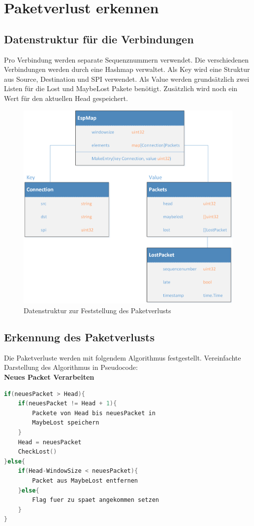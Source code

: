 \section{Paketverlust erkennen}
\label{sec:Paketverlust erkennen}

\subsection{Datenstruktur für die \esp Verbindungen}
Pro Verbindung werden separate Sequenznummern verwendet. Die verschiedenen Verbindungen werden durch eine Hashmap verwaltet. Als Key wird eine Struktur aus Source, Destination und \acs{SPI} verwendet. Als Value werden grundsätzlich zwei Listen für die Lost und MaybeLost Pakete benötigt. Zusätzlich wird noch ein Wert für den aktuellen Head gespeichert.


\begin{figure}[H]
    \begin{center}
        \includegraphics[trim=1 0 0 0,clip,width=\textwidth]{start/img/Datenstruktur.png}
    \end{center}
    \caption{Datenstruktur zur Feststellung des Paketverlusts}
\end{figure}

\subsection{Erkennung des Paketverlusts}
Die Paketverluste werden mit folgendem Algorithmus festgestellt.
Vereinfachte Darstellung des Algorithmus in Pseudocode:
\\
\textbf{Neues Packet Verarbeiten}
\begin{lstlisting}[language=go]
if(neuesPacket > Head){
	if(neuesPacket != Head + 1){
		Packete von Head bis neuesPacket in 
		MaybeLost speichern
	}
	Head = neuesPacket
	CheckLost()
}else{
	if(Head-WindowSize < neuesPacket){
		Packet aus MaybeLost entfernen
	}else{
		Flag fuer zu spaet angekommen setzen	
	}
}
\end{lstlisting}

